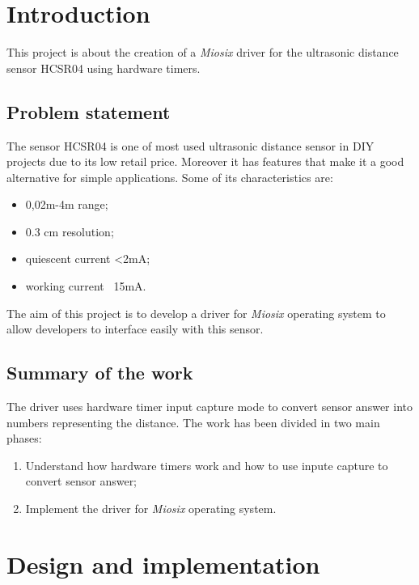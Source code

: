 \section{Introduction}
This project is about the creation of a \textit{Miosix} driver for the ultrasonic distance sensor HCSR04 using hardware timers. 
\subsection{Problem statement}
The sensor HCSR04 is one of most used ultrasonic distance sensor in DIY projects due to its low retail price. Moreover it has features that make it a good alternative for simple applications. Some of its characteristics are:
\begin{itemize}
\item 0,02m-4m range;
\item 0.3 cm resolution;
\item quiescent current <2mA;
\item working current ~15mA.
\end{itemize}  
The aim of this project is to develop a driver for \textit{Miosix} operating system to allow developers to interface easily with this sensor.
\subsection{Summary of the work}
The driver uses hardware timer input capture mode to convert sensor answer into numbers representing the distance. The work has been divided in two main phases:
\begin{enumerate}
\item Understand how hardware timers work and how to use inpute capture to convert sensor answer;
\item Implement the driver for \textit{Miosix} operating system.
\end{enumerate}

\pagebreak

\section{Design and implementation}
